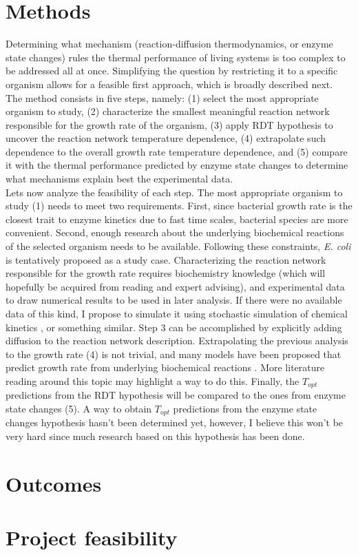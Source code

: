 \documentclass[titlepage,11pt]{article}
\begin{document}
\begin{linenumbers}
		\section{Methods}
		Determining what mechanism (reaction-diffusion thermodynamics, or enzyme state changes) rules the thermal performance of living systems is too complex to be addressed all at once. Simplifying the question by restricting it to a specific organism allows for a feasible first approach, which is broadly described next.\\
		The method consists in five steps, namely: (1) select the most appropriate organism to study, (2) characterize the smallest meaningful reaction network responsible for the growth rate of the organism, (3) apply RDT hypothesis to uncover the reaction network temperature dependence, (4) extrapolate such dependence to the overall growth rate temperature dependence, and (5) compare it with the thermal performance predicted by enzyme state changes to determine what mechanisms explain best the experimental data.\\
		Lets now analyze the feasibility of each step. The most appropriate organism to study (1) needs to meet two requirements. First, since bacterial growth rate is the closest trait to enzyme kinetics due to fast time scales, bacterial species are more convenient. Second, enough research about the underlying biochemical reactions of the selected organism needs to be available. Following these constraints, \textit{E. coli} is tentatively proposed as a study case. Characterizing the reaction network responsible for the growth rate requires biochemistry knowledge (which will hopefully be acquired from reading and expert advising), and experimental data to draw numerical results to be used in later analysis. If there were no available data of this kind, I propose to simulate it using stochastic simulation of chemical kinetics \cite{Gillespie2007}, or something similar. Step 3 can be accomplished by explicitly adding diffusion to the reaction network description. Extrapolating the previous analysis to the growth rate (4) is not trivial, and many models have been proposed that predict growth rate from underlying biochemical reactions \cite{DeJong2017}. More literature reading around this topic may highlight a way to do this. Finally, the $ T_{opt} $ predictions from the RDT hypothesis will be compared to the ones from enzyme state changes (5). A way to obtain $ T_{opt} $ predictions from the enzyme state changes hypothesis hasn't been determined yet, however, I believe this won't be very hard since much research based on this hypothesis has been done.
		\section{Outcomes}
		
		\section{Project feasibility}
	\end{linenumbers}
	\newpage
	
	
\end{document}
